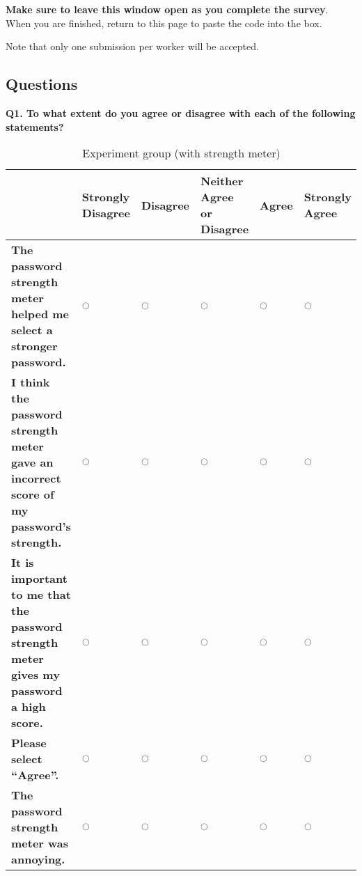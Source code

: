         \textbf{Make sure to leave this window open as you complete the survey}. When you are finished, return to this page to paste the code into the box.

        Note that only one submission per worker will be accepted.


    \subsection{Questions}
    \label{apss:usability_questions}
    {\setmainfont[Mapping=TeX-text,Ligatures=TeX]{Helvetica}
    \textbf{Q1. To what extent do you agree or disagree with each of the following statements?}
      \begin{table}[H]
        \centering
        \scriptsize
        \hspace*{-1cm}
        \begin{tabular}{|P{6.8cm}|P{1.6cm}|P{1.1cm}|P{2.2cm}|P{0.8cm}|P{1.3cm}|}
        \hline
         & \textbf{Strongly Disagree} & \textbf{Disagree} & \textbf{Neither Agree or Disagree} & \textbf{Agree} & \textbf{Strongly Agree} \\
        \hline
        \textbf{The password strength meter helped me select a stronger password.} & $\ocircle$ & $\ocircle$ & $\ocircle$ & $\ocircle$ & $\ocircle$ \\
        \hline
          \textbf{I think the password strength meter gave an incorrect score of my password's strength.} & $\ocircle$ & $\ocircle$ & $\ocircle$ & $\ocircle$ & $\ocircle$ \\
        \hline
          \textbf{It is important to me that the password strength meter gives my password a high score.} & $\ocircle$ & $\ocircle$ & $\ocircle$ & $\ocircle$ & $\ocircle$ \\
        \hline
          \textbf{Please select ``Agree''.} & $\ocircle$ & $\ocircle$ & $\ocircle$ & $\ocircle$ & $\ocircle$ \\
        \hline
        \textbf{The password strength meter was annoying.} & $\ocircle$ & $\ocircle$ & $\ocircle$ & $\ocircle$ & $\ocircle$ \\
        \hline
        \end{tabular}
        \caption{Experiment group (with strength meter)}
      \end{table}

}
